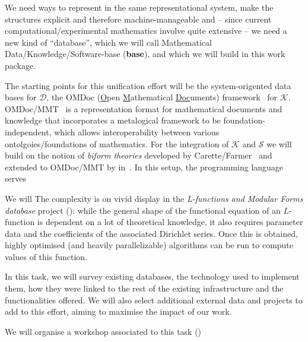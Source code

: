 \begin{workpackage}[id=dksbases,%
  title=Dks/Knowledge/Software-Bases,lead=JU,
  ZHRM=12,JURM=36,USHRM=12,UWRM=25,SARM=10,LLRM=2,PSRM=4]
\begin{wpdescription}
  We need ways to represent \DKS in the same representational system, make the \DKS
  structures explicit and therefore machine-manageable and -- since current
  computational/experimental mathematics involve quite extensive \DKS -- we need a new
  kind of ``database'', which we will call Mathematical Data/Knowledge/Software-base
  (\textbf{\DKS base}), and which we will build in this work package.

  The starting points for this unification effort will be the system-origented data bases
  for $\mathcal{D}$, the OMDoc (\underline{O}pen \underline{M}athematical
  \underline{Doc}uments) framework~\cite{Kohlhase:OMDoc1.2} for $\mathcal{K}$.
  OMDoc/MMT~\cite{RabKoh:WSMSML13} is a representation format for mathematical documents
  and knowledge that incorporates a metalogical framework to be foundation-independent,
  which allows interoperability between various ontolgoies/foundations of mathematics. For
  the integration of $\mathcal{K}$ and $\mathcal{S}$ we will build on the notion of
  \emph{biform theories} developed by Carette/Farmer~\cite{btc07} and extended to
  OMDoc/MMT by  in~\cite{KohManRab:aumftg13}. In this setup, the programming
  language serves


 We will  The complexity is on vivid display in the \emph{L-functions and Modular Forms database}
  project (\LMFDB): while the general shape of the functional equation of an $L$-function
  is dependent on a lot of theoretical knowledge, it also requires parameter data and the
  coefficients of the associated Dirichlet series. Once this is obtained, highly optimised
  (and heavily parallelizable) algorithms can be run to compute values of this function.
\end{wpdescription}

\begin{tasklist}
\begin{task}[title={Survey of existing \DKS bases, Formulation of requirements},
  id=data-assessment,lead=ZH,partners={JU,SA,UW,US},wphases=0-3!.5,PM=2]
  In this task, we will survey existing databases, the technology used to implement them,
  how they were linked to the rest of the existing infrastructure and the functionalities
  offered. We will also select additional external data and projects to add to this
  effort, aiming to maximise the impact of our work.

  We will organise a workshop associated to this task ()
\end{task}


\end{tasklist}
\end{workpackage}
